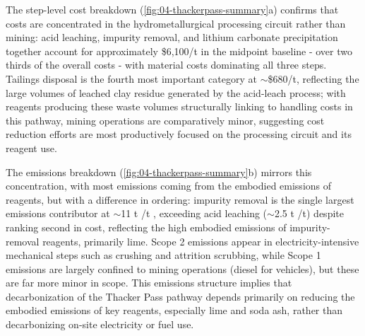 The step-level cost breakdown (\ref{fig:04-thackerpass-summary}a) confirms that costs are concentrated in the hydrometallurgical processing circuit rather than mining: acid leaching, impurity removal, and lithium carbonate precipitation together account for approximately \$6,100/t  in the midpoint baseline - over two thirds of the overall costs - with material costs dominating all three steps. Tailings disposal is the fourth most important category at $\sim$\$680/t, reflecting the large volumes of leached clay residue generated by the acid-leach process; with reagents producing these waste volumes structurally linking to handling costs in this pathway, mining operations are comparatively minor, suggesting cost reduction efforts are most productively focused on the processing circuit and its reagent use. 

The emissions breakdown (\ref{fig:04-thackerpass-summary}b) mirrors this concentration, with most emissions coming from the embodied emissions of reagents, but with a difference in ordering: impurity removal is the single largest emissions contributor at $\sim$11 t /t , exceeding acid leaching ($\sim$2.5 t /t) despite ranking second in cost, reflecting the high embodied emissions of impurity-removal reagents, primarily lime. Scope 2 emissions appear in electricity-intensive mechanical steps such as crushing and attrition scrubbing, while Scope 1 emissions are largely confined to mining operations (diesel for vehicles), but these are far more minor in scope. This emissions structure implies that decarbonization of the Thacker Pass pathway depends primarily on reducing the embodied emissions of key reagents, especially lime and soda ash, rather than decarbonizing on-site electricity or fuel use.

